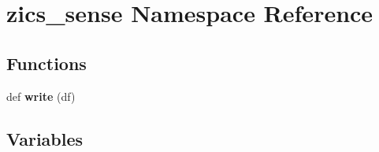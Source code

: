 \hypertarget{namespacezics__sense}{}\section{zics\+\_\+sense Namespace Reference}
\label{namespacezics__sense}
\subsection*{Functions}
\begin{DoxyCompactItemize}
\item 
\mbox{\label{namespacezics__sense_adca209f54fd7c6cdf4704b40f3d03b25}} 
def {\bfseries write} (df)
\end{DoxyCompactItemize}
\subsection*{Variables}
